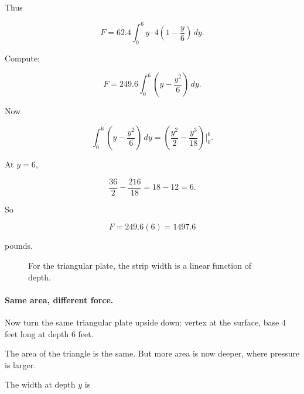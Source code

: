 Thus

\[
F=62.4\int_0^6 y\cdot4\left(1-\frac{y}{6}\right)\,dy.
\]

Compute:

\[
F
=
249.6\int_0^6 \left(y-\frac{y^2}{6}\right)\,dy.
\]

Now

\[
\int_0^6 \left(y-\frac{y^2}{6}\right)\,dy
=
\left(\frac{y^2}{2}-\frac{y^3}{18}\right)\Big|_0^6.
\]

At \(y=6\),

\[
\frac{36}{2}-\frac{216}{18}
=
18-12
=
6.
\]

So

\[
F=249.6(6)=\boxed{1497.6}
\]

pounds.

\begin{figure}[h]
\centering
{}
\caption{For the triangular plate, the strip width is a linear function of depth.}
\label{fig:hydrostatic-triangle}
\end{figure}

\paragraph{Same area, different force.}
Now turn the same triangular plate upside down: vertex at the surface, base \(4\) feet
long at depth \(6\) feet.

The area of the triangle is the same.  But more area is now deeper, where pressure is
larger.

The width at depth \(y\) is

